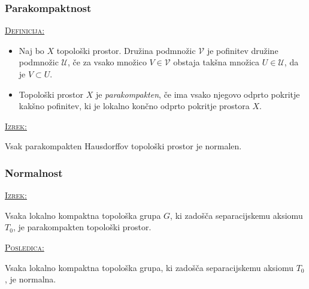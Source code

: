 \documentclass[a4paper, 12pt]{beamer}
\newenvironment{matematika}[1]{
\textcolor{bostonuniversityred}{\underline{\textsc{#1:}}}
}{
}
\begin{document}
\begin{frame}
\frametitle{Parakompaktnost}
\begin{matematika}{Definicija}
\begin{itemize}
\item
Naj bo $X$ topološki prostor. Družina podmnožic $\mathcal{V}$ je pofinitev družine podmnožic $\mathcal{U}$, če za vsako množico $V \in \mathcal{V}$ obstaja takšna množica $U \in \mathcal{U}$, da je $V \subset U$.
\item
Topološki prostor $X$ je \emph{parakompakten}, če ima vsako njegovo odprto pokritje kakšno pofinitev, ki je lokalno končno odprto pokritje prostora $X$.\newline
\end{itemize}
\end{matematika}
\begin{matematika}{Izrek}
Vsak parakompakten Hausdorffov topološki prostor je normalen.
\end{matematika}
\end{frame}

\begin{frame}
\frametitle{Normalnost}
\begin{matematika}{Izrek}
Vsaka lokalno kompaktna topološka grupa $G$, ki zadošča separacijskemu aksiomu $T_0$, je parakompakten topološki prostor.
\end{matematika}\newline\newline

\begin{matematika}{Posledica}
Vsaka lokalno kompaktna topološka grupa, ki zadošča separacijskemu aksiomu $T_0$, je normalna.
\end{matematika}
\end{frame}
\end{document}
